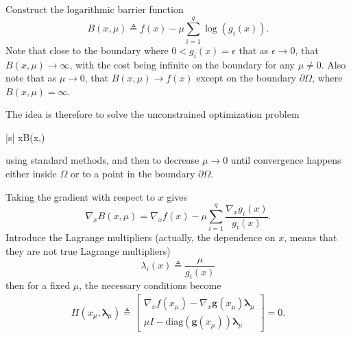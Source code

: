 \documentclass{article}
\begin{document}
	Construct the logarithmic barrier function
	\[
	B(x, \mu) \triangleq f(x) - \mu\sum_{i=1}^q \log(g_i(x)).
	\]
	Note that close to the boundary where $0<g_i(x)=\epsilon$ that as $\epsilon\to 0$, that $B(x,\mu)\to\infty$, with the cost being infinite on the boundary for any $\mu\neq 0$. 
	Also note that as $\mu\to 0$, that $B(x,\mu)\to f(x)$ except on the boundary $\partial\Omega$, where $B(x,\mu)=\infty$.  
	
	The idea is therefore to solve the unconstrained optimization problem 
		\begin{mini*}|s|
				{x\in\Omega}{B(x,\mu)}{}{}
		\end{mini*}
	using standard methods, 	and then to decrease $\mu\to 0$ until convergence happens either inside $\Omega$ or to a point in the boundary $\partial\Omega$.
	
	
	Taking the gradient with respect to $x$ gives
	\[
	\nabla_x B(x, \mu) = \nabla_x f(x) - \mu\sum_{i=1}^q \frac{\nabla_x g_i(x)}{g_i(x)}.
	\]	
	Introduce the Lagrange multipliers (actually, the dependence on $x$, means that they are not true Lagrange multipliers)
	\[
	\lambda_i(x) \triangleq \frac{\mu}{g_i(x)}
	\]
	then for a fixed $\mu$, the necessary conditions become
	\begin{align*}
	H(x_\mu, \boldsymbol{\lambda}_{\mu}) \triangleq 
		\begin{bmatrix}
 			\nabla_x f(x_\mu) - \nabla_x \mathbf{g}(x_\mu) \boldsymbol{\lambda}_\mu \\
 			\mu I - \text{diag}(\mathbf{g}(x_\mu))\boldsymbol{\lambda}_{\mu}
 		\end{bmatrix} = 0.
	\end{align*}
	
\end{document}
